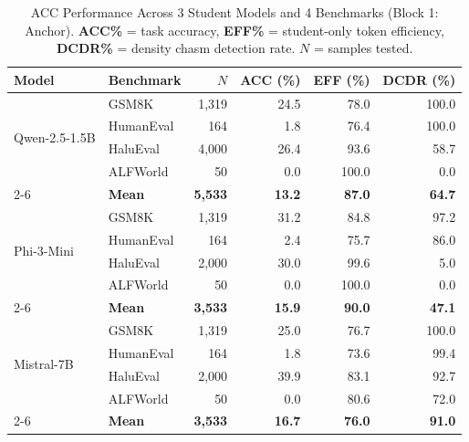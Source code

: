 \documentclass{uai2026}  %
\begin{document}
\begin{table}[t]
\centering
\caption{ACC Performance Across 3 Student Models and 4 Benchmarks (Block 1: Anchor).
\textbf{ACC\%} = task accuracy, \textbf{EFF\%} = student-only token efficiency,
\textbf{DCDR\%} = density chasm detection rate. $N$ = samples tested.}
\label{tab:main_results}
\footnotesize
\begin{tabular}{@{}llrrrr@{}}
\toprule
\textbf{Model} & \textbf{Benchmark} & \textbf{$N$} & \textbf{ACC (\%)} & \textbf{EFF (\%)} & \textbf{DCDR (\%)} \\
\midrule
\multirow{4}{*}{Qwen-2.5-1.5B}
 & GSM8K      & 1,319 & 24.5 & 78.0 & 100.0 \\
 & HumanEval  & 164   & 1.8  & 76.4 & 100.0 \\
 & HaluEval   & 4,000 & 26.4 & 93.6 & 58.7  \\
 & ALFWorld   & 50    & 0.0  & 100.0 & 0.0  \\
\cmidrule{2-6}
 & \textbf{Mean} & \textbf{5,533} & \textbf{13.2} & \textbf{87.0} & \textbf{64.7} \\
\midrule
\multirow{4}{*}{Phi-3-Mini}
 & GSM8K      & 1,319 & 31.2 & 84.8 & 97.2  \\
 & HumanEval  & 164   & 2.4  & 75.7 & 86.0  \\
 & HaluEval   & 2,000 & 30.0 & 99.6 & 5.0   \\
 & ALFWorld   & 50    & 0.0  & 100.0 & 0.0  \\
\cmidrule{2-6}
 & \textbf{Mean} & \textbf{3,533} & \textbf{15.9} & \textbf{90.0} & \textbf{47.1} \\
\midrule
\multirow{4}{*}{Mistral-7B}
 & GSM8K      & 1,319 & 25.0 & 76.7 & 100.0 \\
 & HumanEval  & 164   & 1.8  & 73.6 & 99.4  \\
 & HaluEval   & 2,000 & 39.9 & 83.1 & 92.7  \\
 & ALFWorld   & 50    & 0.0  & 80.6 & 72.0  \\
\cmidrule{2-6}
 & \textbf{Mean} & \textbf{3,533} & \textbf{16.7} & \textbf{76.0} & \textbf{91.0} \\
\bottomrule
\end{tabular}
\end{table}
\end{document}
